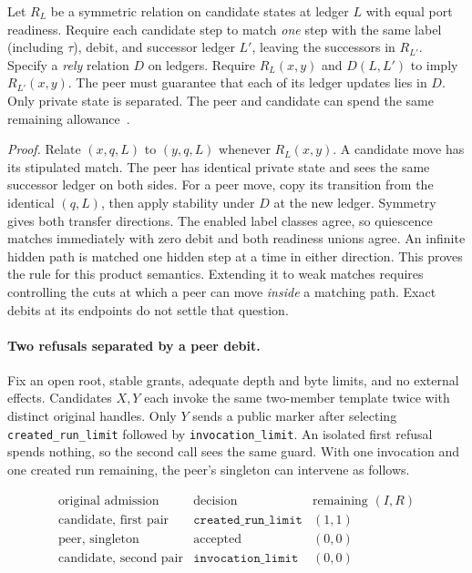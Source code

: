 \documentclass[11pt,a4paper]{article}
\theoremstyle{definition}
\theoremstyle{remark}
\begin{document}
Let $R_L$ be a symmetric relation on candidate states at ledger $L$ with equal port readiness. Require each candidate step to match \emph{one} step with the same label (including $\tau$), debit, and successor ledger $L'$, leaving the successors in $R_{L'}$. Specify a \emph{rely} relation $D$ on ledgers. Require $R_L(x,y)$ and $D(L,L')$ to imply $R_{L'}(x,y)$. The peer must guarantee that each of its ledger updates lies in $D$. Only private state is separated. The peer and candidate can spend the same remaining allowance~\cite{jones1983interfering,ohearn2007resources}.

\emph{Proof.} Relate $(x,q,L)$ to $(y,q,L)$ whenever $R_L(x,y)$. A candidate move has its stipulated match. The peer has identical private state and sees the same successor ledger on both sides. For a peer move, copy its transition from the identical $(q,L)$, then apply stability under $D$ at the new ledger. Symmetry gives both transfer directions. The enabled label classes agree, so quiescence matches immediately with zero debit and both readiness unions agree. An infinite hidden path is matched one hidden step at a time in either direction. This proves the rule for this product semantics. Extending it to weak matches requires controlling the cuts at which a peer can move \emph{inside} a matching path. Exact debits at its endpoints do not settle that question.

\paragraph{Two refusals separated by a peer debit.}\label{par:peer-refusal-witness} Fix an open root, stable grants, adequate depth and byte limits, and no external effects. Candidates $X,Y$ each invoke the same two-member template twice with distinct original handles. Only $Y$ sends a public marker after selecting \texttt{created\_run\_limit} followed by \texttt{invocation\_limit}. An isolated first refusal spends nothing, so the second call sees the same guard. With one invocation and one created run remaining, the peer's singleton can intervene as follows.

\[
\begin{array}{l|l|c}
\text{original admission} & \text{decision} & \text{remaining }(I,R)\\ \hline
\text{candidate, first pair} & \mathtt{created\_run\_limit} & (1,1)\\
\text{peer, singleton} & \text{accepted} & (0,0)\\
\text{candidate, second pair} & \mathtt{invocation\_limit} & (0,0)
\end{array}
\]
\end{document}
